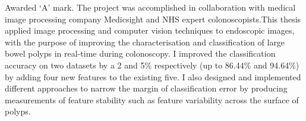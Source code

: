Awarded `A' mark. The project was accomplished in collaboration with medical image processing company Medicsight and NHS expert colonoscopists.This thesis applied image processing and computer vision techniques to endoscopic images, with the purpose of improving the characterisation and classification of large bowel polyps in real-time during colonoscopy.
I improved the classification accuracy on two datasets by a 2 and 5\% respectively (up to 86.44\% and 94.64\%) by adding four new features to the existing five.
I also designed and implemented different approaches to narrow the margin of classification error by producing measurements of feature stability such as feature variability across the surface of polyps.